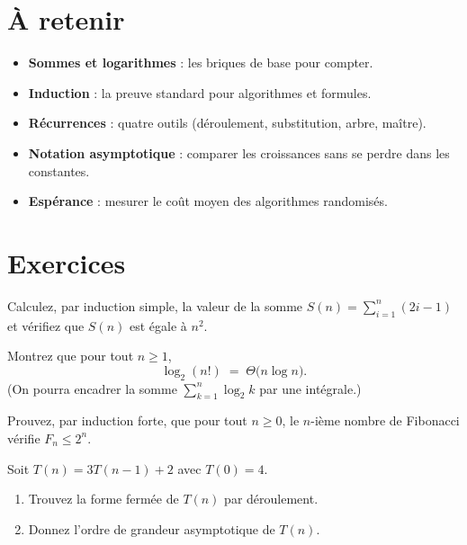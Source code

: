 \section*{À retenir}

\begin{itemize}
  \item \textbf{Sommes et logarithmes }: les briques de base pour compter.
  \item \textbf{Induction }: la preuve standard pour algorithmes et formules.
  \item \textbf{Récurrences }: quatre outils (déroulement, substitution, arbre, maître).
  \item \textbf{Notation asymptotique }: comparer les croissances sans se perdre
        dans les constantes.
  \item \textbf{Espérance }: mesurer le coût moyen des algorithmes randomisés.
\end{itemize}

\section{Exercices}
\begin{exercice}
Calculez, par induction simple, la valeur de la somme
\(\displaystyle S(n)=\sum_{i=1}^{n}(2i-1)\)
et vérifiez que \(S(n)\) est égale à \(n^{2}\).  %
\end{exercice}

\begin{exercice}
Montrez que pour tout \(n\ge1\),
\[
\log_2(n!) \;=\; \Theta\!\bigl(n\log n\bigr).
\]
(On pourra encadrer la somme \(\sum_{k=1}^{n}\log_2 k\) par une intégrale.)  %
\end{exercice}

\begin{exercice}
Prouvez, par induction forte, que pour tout \(n\ge 0\),
le \(n\)-ième nombre de Fibonacci vérifie
\(F_{n}\le 2^{n}\).  %
\end{exercice}

\begin{exercice}
Soit \(T(n)=3T(n-1)+2\) avec \(T(0)=4\).
\begin{enumerate}[label=\alph*)]
  \item Trouvez la forme fermée de \(T(n)\) par déroulement.
  \item Donnez l’ordre de grandeur asymptotique de \(T(n)\).
\end{enumerate} %
\end{exercice}

